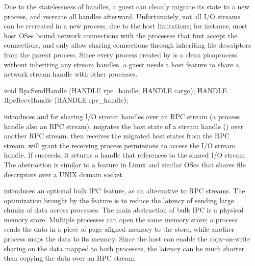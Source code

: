 Due to the statelessness of handles,
a guest can cleanly migrate its state to a new process, and recreate all handles afterward.
Unfortunately, not all I/O streams can be recreated
in a new process, due to the host limitations;
for instance, most host OSes bound network connections with the processes that first accept the connections,
and only allow sharing connections through inheriting
file descriptors from the parent process.
Since every process created by  is a clean picoprocess without inheriting any stream handles,
a guest needs a host feature
to share a network stream handle with other processes.


\begin{paldef}
void   RpcSendHandle (HANDLE rpc_handle, HANDLE cargo);
HANDLE RpcRecvHandle (HANDLE rpc_handle);
\end{paldef}



\Thehostabi{} introduces  and  for sharing I/O stream handles over an RPC stream (a process handle also an RPC stream).
migrates the host state of a stream handle ()
over another RPC stream.
then receives the migrated host states from the RPC stream.
will grant the receiving process permissions to access the I/O stream handle. %
If  succeeds, it returns a handle
that references to the shared I/O stream.
The abstraction is similar to a feature in Linux and similar OSes that
shares file descriptors over a UNIX domain socket.






\Thehostabi{} introduces an optional bulk IPC feature, as an alternative to RPC streams.
The optimization brought
by the feature
is to reduce the latency of sending large chunks of data across processes.
The main abstraction of bulk IPC is a physical memory store.
Multiple processes can open the same memory store;
a process sends the data in a piece of page-aligned memory to the store,
while another process maps the data to its memory.
Since the host can enable the copy-on-write sharing on the data mapped to both processes,
the latency can be much shorter than copying the data over an RPC stream.


